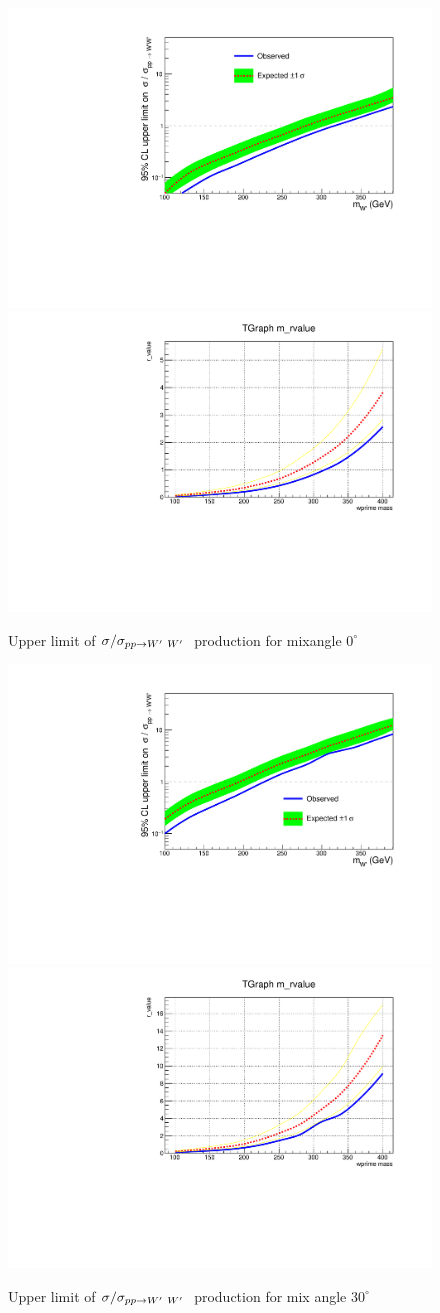 
 
\begin{figure}[!ht]
\centering
\includegraphics*[width=.45\textwidth]{figs/mix0b.pdf}
\hspace{3mm}
\includegraphics*[width=.45\textwidth]{figs/mix0.pdf}
\caption{Upper limit of $\sigma/\sigma_{pp \rightarrow W^\prime~ W^\prime~}$ production for mixangle $0^\circ$ }
\label{fig:mix0}
\end{figure}
 
\begin{figure}[!ht]
\centering
\includegraphics*[width=.45\textwidth]{figs/mix30b.pdf}
\hspace{3mm}
\includegraphics*[width=.45\textwidth]{figs/mix30.pdf}
\caption{Upper limit of $\sigma/\sigma_{pp \rightarrow W^\prime~ W^\prime~}$ production for mix angle $30^\circ$ }
\label{fig:mix30}
\end{figure}

